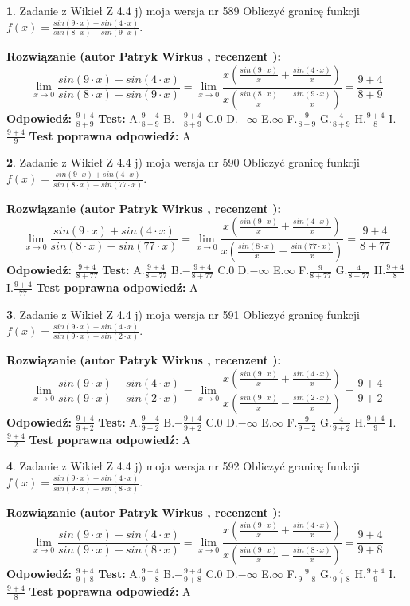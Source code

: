 \documentclass[12pt, a4paper]{article}
\theoremstyle{definition} %
\newtheorem{zad}{}
\newcommand{\zadStart}[1]{\begin{zad}#1\newline}
\newcommand{\zadStop}{\end{zad}}
\newcommand{\rozwStart}[2]{\noindent \textbf{Rozwiązanie (autor #1 , recenzent #2): }\newline}
\newcommand{\rozwStop}{\newline}
\newcommand{\odpStart}{\noindent \textbf{Odpowiedź:}\newline}
\newcommand{\odpStop}{\newline}
\newcommand{\testStart}{\noindent \textbf{Test:}\newline}
\newcommand{\testStop}{\newline}
\newcommand{\kluczStart}{\noindent \textbf{Test poprawna odpowiedź:}\newline}
\newcommand{\kluczStop}{\newline}
\begin{document}
\zadStart{Zadanie z Wikieł Z 4.4 j) moja wersja nr 589}
Obliczyć granicę funkcji $f(x)=\frac{sin(9\cdot x) +sin(4\cdot x)}{sin(8\cdot x) -sin(9\cdot x)}$.
\zadStop
\rozwStart{Patryk Wirkus}{}
$$\lim\limits_{x\to 0}\frac{sin(9\cdot x) +sin(4\cdot x)}{sin(8\cdot x) -sin(9\cdot x)}=\lim\limits_{x\to 0}\frac{x(\frac{sin(9\cdot x)}{x}+\frac{sin(4\cdot x)}{x})}{x(\frac{sin(8\cdot x)}{x}-\frac{sin(9\cdot x)}{x})}=\frac{9+4}{8+9}$$
\rozwStop
\odpStart
$\frac{9+4}{8+9}$
\odpStop
\testStart
A.$\frac{9+4}{8+9}$
B.$-\frac{9+4}{8+9}$
C.$0$
D.$-\infty$
E.$\infty$
F.$\frac{9}{8+9}$
G.$\frac{4}{8+9}$
H.$\frac{9+4}{8}$
I.$\frac{9+4}{9}$
\testStop
\kluczStart
A
\kluczStop



\zadStart{Zadanie z Wikieł Z 4.4 j) moja wersja nr 590}
Obliczyć granicę funkcji $f(x)=\frac{sin(9\cdot x) +sin(4\cdot x)}{sin(8\cdot x) -sin(77\cdot x)}$.
\zadStop
\rozwStart{Patryk Wirkus}{}
$$\lim\limits_{x\to 0}\frac{sin(9\cdot x) +sin(4\cdot x)}{sin(8\cdot x) -sin(77\cdot x)}=\lim\limits_{x\to 0}\frac{x(\frac{sin(9\cdot x)}{x}+\frac{sin(4\cdot x)}{x})}{x(\frac{sin(8\cdot x)}{x}-\frac{sin(77\cdot x)}{x})}=\frac{9+4}{8+77}$$
\rozwStop
\odpStart
$\frac{9+4}{8+77}$
\odpStop
\testStart
A.$\frac{9+4}{8+77}$
B.$-\frac{9+4}{8+77}$
C.$0$
D.$-\infty$
E.$\infty$
F.$\frac{9}{8+77}$
G.$\frac{4}{8+77}$
H.$\frac{9+4}{8}$
I.$\frac{9+4}{77}$
\testStop
\kluczStart
A
\kluczStop



\zadStart{Zadanie z Wikieł Z 4.4 j) moja wersja nr 591}
Obliczyć granicę funkcji $f(x)=\frac{sin(9\cdot x) +sin(4\cdot x)}{sin(9\cdot x) -sin(2\cdot x)}$.
\zadStop
\rozwStart{Patryk Wirkus}{}
$$\lim\limits_{x\to 0}\frac{sin(9\cdot x) +sin(4\cdot x)}{sin(9\cdot x) -sin(2\cdot x)}=\lim\limits_{x\to 0}\frac{x(\frac{sin(9\cdot x)}{x}+\frac{sin(4\cdot x)}{x})}{x(\frac{sin(9\cdot x)}{x}-\frac{sin(2\cdot x)}{x})}=\frac{9+4}{9+2}$$
\rozwStop
\odpStart
$\frac{9+4}{9+2}$
\odpStop
\testStart
A.$\frac{9+4}{9+2}$
B.$-\frac{9+4}{9+2}$
C.$0$
D.$-\infty$
E.$\infty$
F.$\frac{9}{9+2}$
G.$\frac{4}{9+2}$
H.$\frac{9+4}{9}$
I.$\frac{9+4}{2}$
\testStop
\kluczStart
A
\kluczStop



\zadStart{Zadanie z Wikieł Z 4.4 j) moja wersja nr 592}
Obliczyć granicę funkcji $f(x)=\frac{sin(9\cdot x) +sin(4\cdot x)}{sin(9\cdot x) -sin(8\cdot x)}$.
\zadStop
\rozwStart{Patryk Wirkus}{}
$$\lim\limits_{x\to 0}\frac{sin(9\cdot x) +sin(4\cdot x)}{sin(9\cdot x) -sin(8\cdot x)}=\lim\limits_{x\to 0}\frac{x(\frac{sin(9\cdot x)}{x}+\frac{sin(4\cdot x)}{x})}{x(\frac{sin(9\cdot x)}{x}-\frac{sin(8\cdot x)}{x})}=\frac{9+4}{9+8}$$
\rozwStop
\odpStart
$\frac{9+4}{9+8}$
\odpStop
\testStart
A.$\frac{9+4}{9+8}$
B.$-\frac{9+4}{9+8}$
C.$0$
D.$-\infty$
E.$\infty$
F.$\frac{9}{9+8}$
G.$\frac{4}{9+8}$
H.$\frac{9+4}{9}$
I.$\frac{9+4}{8}$
\testStop
\kluczStart
A
\kluczStop
\end{document}
